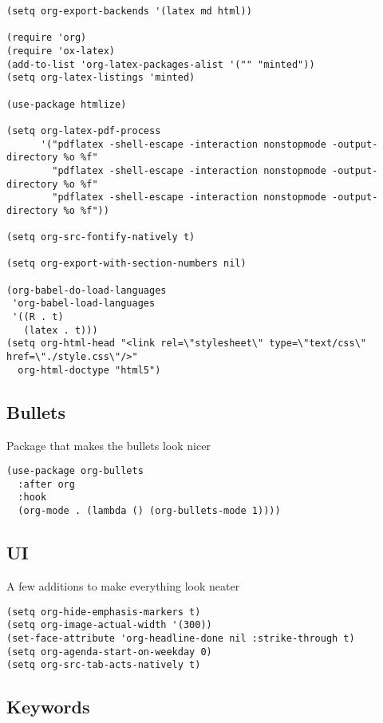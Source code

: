 \documentclass[11pt]{article}
\begin{document}
\begin{verbatim}
(setq org-export-backends '(latex md html))

(require 'org)
(require 'ox-latex)
(add-to-list 'org-latex-packages-alist '("" "minted"))
(setq org-latex-listings 'minted) 

(use-package htmlize)

(setq org-latex-pdf-process
      '("pdflatex -shell-escape -interaction nonstopmode -output-directory %o %f"
        "pdflatex -shell-escape -interaction nonstopmode -output-directory %o %f"
        "pdflatex -shell-escape -interaction nonstopmode -output-directory %o %f"))

(setq org-src-fontify-natively t)

(setq org-export-with-section-numbers nil)

(org-babel-do-load-languages
 'org-babel-load-languages
 '((R . t)
   (latex . t)))
(setq org-html-head "<link rel=\"stylesheet\" type=\"text/css\" href=\"./style.css\"/>"
  org-html-doctype "html5")
\end{verbatim}

\subsection*{Bullets}
\label{sec:orgd95871a}

Package that makes the bullets look nicer

\begin{verbatim}
(use-package org-bullets
  :after org
  :hook
  (org-mode . (lambda () (org-bullets-mode 1))))
\end{verbatim}

\subsection*{UI}
\label{sec:org680373a}

A few additions to make everything look neater

\begin{verbatim}
(setq org-hide-emphasis-markers t)
(setq org-image-actual-width '(300))
(set-face-attribute 'org-headline-done nil :strike-through t)
(setq org-agenda-start-on-weekday 0)
(setq org-src-tab-acts-natively t)
\end{verbatim}

\subsection*{Keywords}
\label{sec:orgf28879f}
\end{document}
